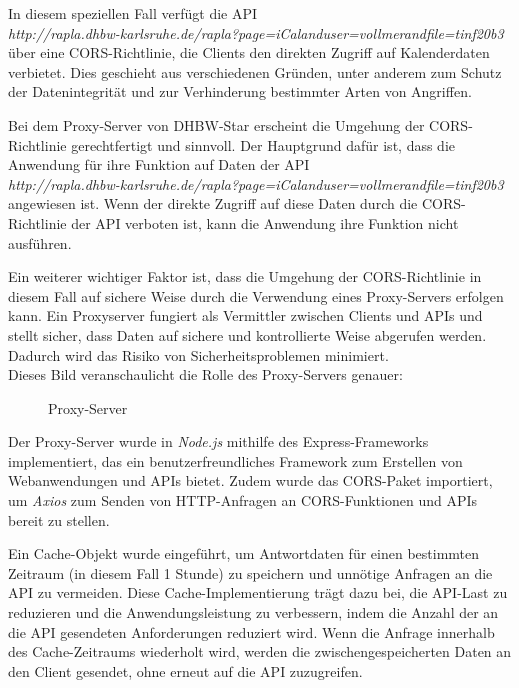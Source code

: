In diesem speziellen Fall verfügt die API\\ \emph{http://rapla.dhbw-karlsruhe.de/rapla?page=iCalanduser=vollmerandfile=tinf20b3} über eine CORS-Richtlinie, die Clients den direkten Zugriff auf Kalenderdaten verbietet. Dies geschieht aus verschiedenen Gründen, unter anderem zum Schutz der Datenintegrität und zur Verhinderung bestimmter Arten von Angriffen\cite{crashtestsecuritycom}.

Bei dem Proxy-Server von DHBW-Star erscheint die Umgehung der CORS-Richtlinie gerechtfertigt und sinnvoll. Der Hauptgrund dafür ist, dass die Anwendung für ihre Funktion auf Daten der API\\ \emph{http://rapla.dhbw-karlsruhe.de/rapla?page=iCalanduser=vollmerandfile=tinf20b3} angewiesen ist. Wenn der direkte Zugriff auf diese Daten durch die CORS-Richtlinie der API verboten ist, kann die Anwendung ihre Funktion nicht ausführen.

Ein weiterer wichtiger Faktor ist, dass die Umgehung der CORS-Richtlinie in diesem Fall auf sichere Weise durch die Verwendung eines Proxy-Servers erfolgen kann. Ein Proxyserver fungiert als Vermittler zwischen Clients und APIs und stellt sicher, dass Daten auf sichere und kontrollierte Weise abgerufen werden. Dadurch wird das Risiko von Sicherheitsproblemen minimiert.\\
Dieses Bild veranschaulicht die Rolle des Proxy-Servers genauer:

\begin{figure}[htbp]
	\centering
	\caption{Proxy-Server}
\end{figure}

Der Proxy-Server wurde in \emph{Node.js} mithilfe des Express-Frameworks implementiert, das ein benutzerfreundliches Framework zum Erstellen von Webanwendungen und APIs bietet. Zudem wurde das CORS-Paket importiert, um \emph{Axios} zum Senden von HTTP-Anfragen an CORS-Funktionen und APIs bereit zu stellen.

Ein Cache-Objekt wurde eingeführt, um Antwortdaten für einen bestimmten Zeitraum (in diesem Fall 1 Stunde) zu speichern und unnötige Anfragen an die API zu vermeiden. Diese Cache-Implementierung trägt dazu bei, die API-Last zu reduzieren und die Anwendungsleistung zu verbessern, indem die Anzahl der an die API gesendeten Anforderungen reduziert wird. Wenn die Anfrage innerhalb des Cache-Zeitraums wiederholt wird, werden die zwischengespeicherten Daten an den Client gesendet, ohne erneut auf die API zuzugreifen.

